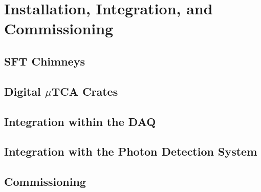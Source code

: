 \section{Installation, Integration, and Commissioning}
\label{sec:dp-tpcelec-install}

\subsection{SFT Chimneys}
\label{sec:dp-tpcelec-install-sft}

\subsection{Digital $\mu$TCA Crates}
\label{ssec:dp-tpcelec-install-utca}

\subsection{Integration within the DAQ}
\label{ssec:dp-tpcelec-install-daq}

\subsection{Integration with the Photon Detection System}
\label{ssec:dp-tpcelec-install-pmt}

\subsection{Commissioning}
\label{ssec:dp-tpcelec-install-comission}

